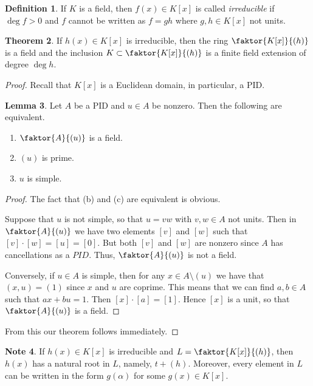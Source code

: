 \documentclass[10pt,letterpaper,cm]{nupset}
\theoremstyle{definition}
\newtheorem{definition}{Definition}[subsection]
\newtheorem{note}[definition]{Note}
\theoremstyle{theorem}
\newtheorem{theorem}[definition]{Theorem}
\newtheorem{lemma}[definition]{Lemma}
\theoremstyle{remark}
\newcommand{\1}{\mathbf{1}}
\newcommand{\0}{\vec 0}
\begin{document}
\begin{definition}
If $K$ is a field, then $f(x) \in K[x]$ is called \textit{irreducible} if $\deg{f}>0$ and $f$ cannot be written as $f=gh$ where $g,h\in K[x]$ not units. 
\end{definition}

\begin{theorem}
If $h(x) \in K[x]$ is irreducible, then the ring $\faktor{K[x]}{(h)}$ is a field and the inclusion $K \subset \faktor{K[x]}{(h)}$ is a finite field extension of degree $\deg{h}$.
\end{theorem}
\begin{proof}
Recall that $K[x]$ is a Euclidean domain, in particular, a PID.
\begin{lemma}
Let $A$ be a PID and $u\in A$ be nonzero. Then the following are equivalent.
\begin{enumerate}[label=(\alph*)]
\item $\faktor{A}{(u)}$ is a field.
\item $(u)$ is prime.
\item$u$ is simple.
\end{enumerate}
\end{lemma}
\begin{proof}
The fact that (b) and (c) are equivalent is obvious. 

\medskip

 Suppose that $u$ is not simple, so that $u= vw$ with $v,w \in A$ not units. Then in $\faktor{A}{(u)}$ we have two elements $[v]$ and $[w]$ such that $[v]\cdot [w] = [u] = [0]$. But both $[v]$ and $[w]$ are nonzero since $A$ has cancellations as a $PID$. Thus, $\faktor{A}{(u)}$ is not a field.

\medskip

 Conversely, if $u\in A$ is simple, then for any $x\in A\setminus (u)$ we have that $(x,u) = (1)$ since $x$ and $u$ are coprime. This means that we can find $a,b\in A$ such that $ax + bu =1$. Then $[x]\cdot[a] = [1]$. Hence $[x]$ is a unit, so that $\faktor{A}{(u)}$ is a field. 
\end{proof}$ $From this our theorem follows immediately. 
\end{proof}

\begin{note}
If $h(x) \in K[x]$ is irreducible  and $L = \faktor{K[x]}{(h)}$, then $h(x)$ has a natural root in $L$, namely, $t + (h)$. Moreover, every element in $L$ can be written in the form $g(\alpha)$ for some $g(x) \in K[x]$.
\end{note}
\end{document}
